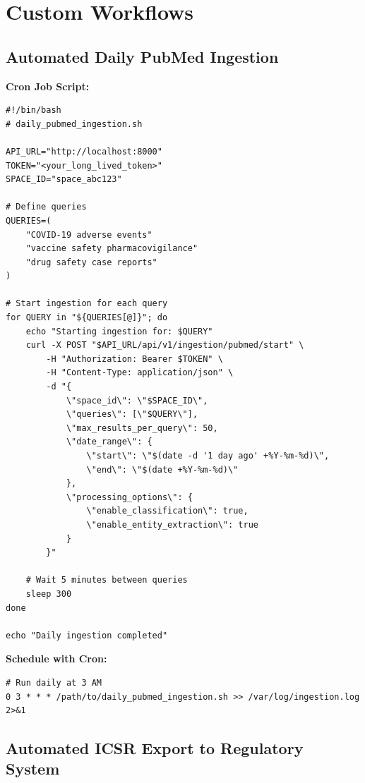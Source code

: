 \section{Custom Workflows}

\subsection{Automated Daily PubMed Ingestion}

\textbf{Cron Job Script:}
\begin{lstlisting}[style=bashstyle]
#!/bin/bash
# daily_pubmed_ingestion.sh

API_URL="http://localhost:8000"
TOKEN="<your_long_lived_token>"
SPACE_ID="space_abc123"

# Define queries
QUERIES=(
    "COVID-19 adverse events"
    "vaccine safety pharmacovigilance"
    "drug safety case reports"
)

# Start ingestion for each query
for QUERY in "${QUERIES[@]}"; do
    echo "Starting ingestion for: $QUERY"
    curl -X POST "$API_URL/api/v1/ingestion/pubmed/start" \
        -H "Authorization: Bearer $TOKEN" \
        -H "Content-Type: application/json" \
        -d "{
            \"space_id\": \"$SPACE_ID\",
            \"queries\": [\"$QUERY\"],
            \"max_results_per_query\": 50,
            \"date_range\": {
                \"start\": \"$(date -d '1 day ago' +%Y-%m-%d)\",
                \"end\": \"$(date +%Y-%m-%d)\"
            },
            \"processing_options\": {
                \"enable_classification\": true,
                \"enable_entity_extraction\": true
            }
        }"
    
    # Wait 5 minutes between queries
    sleep 300
done

echo "Daily ingestion completed"
\end{lstlisting}

\textbf{Schedule with Cron:}
\begin{commandbox}
\begin{lstlisting}[style=bashstyle]
# Run daily at 3 AM
0 3 * * * /path/to/daily_pubmed_ingestion.sh >> /var/log/ingestion.log 2>&1
\end{lstlisting}
\end{commandbox}

\subsection{Automated ICSR Export to Regulatory System}

